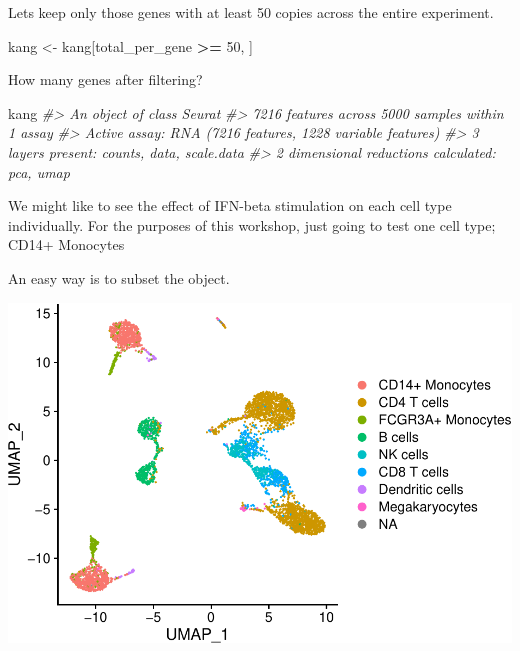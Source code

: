 \documentclass[
]{book}
\newenvironment{Shaded}{\begin{snugshade}}{\end{snugshade}}
\newcommand{\CommentTok}[1]{\textcolor[rgb]{0.56,0.35,0.01}{\textit{#1}}}
\newcommand{\DecValTok}[1]{\textcolor[rgb]{0.00,0.00,0.81}{#1}}
\newcommand{\FunctionTok}[1]{\textcolor[rgb]{0.13,0.29,0.53}{\textbf{#1}}}
\newcommand{\NormalTok}[1]{#1}
\newcommand{\OtherTok}[1]{\textcolor[rgb]{0.56,0.35,0.01}{#1}}
\newcommand{\SpecialCharTok}[1]{\textcolor[rgb]{0.81,0.36,0.00}{\textbf{#1}}}
\begin{document}
Lets keep only those genes with at least 50 copies across the entire experiment.

\begin{Shaded}
\begin{Highlighting}[]
\NormalTok{kang }\OtherTok{\textless{}{-}}\NormalTok{ kang[total\_per\_gene }\SpecialCharTok{\textgreater{}=} \DecValTok{50}\NormalTok{, ] }
\end{Highlighting}
\end{Shaded}

How many genes after filtering?

\begin{Shaded}
\begin{Highlighting}[]
\NormalTok{kang}
\CommentTok{\#\textgreater{} An object of class Seurat }
\CommentTok{\#\textgreater{} 7216 features across 5000 samples within 1 assay }
\CommentTok{\#\textgreater{} Active assay: RNA (7216 features, 1228 variable features)}
\CommentTok{\#\textgreater{}  3 layers present: counts, data, scale.data}
\CommentTok{\#\textgreater{}  2 dimensional reductions calculated: pca, umap}
\end{Highlighting}
\end{Shaded}

We might like to see the effect of IFN-beta stimulation on each cell type individually. For the purposes of this workshop, just going to test one cell type; CD14+ Monocytes

An easy way is to subset the object.

\begin{Shaded}
\end{Shaded}

\includegraphics{scRNAseqInR_Doco_files/figure-latex/unnamed-chunk-51-1.pdf}
\end{document}
